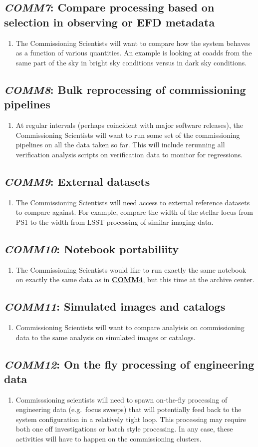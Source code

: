 \documentclass[DM,toc,lsstdraft]{lsstdoc}
\newcommand{\usecase}[3]{%
\subsection{\emph{#1}: #2}
\label{use:#1}
\begin{enumerate}[label=\alph*.]
#3
\end{enumerate}
}
\newcommand{\useref}[1]{\hyperref[use:#1]{\textcolor{lsstblue}{\textbf{#1}}}}
\begin{document}
\usecase{COMM7}{Compare processing based on selection in observing or EFD metadata}{%

\item
The Commissioning Scientists will want to compare how the system behaves as a function of various quantities.
An example is looking at coadds from the same part of the sky in bright sky conditions versus in dark sky conditions.

}

\usecase{COMM8}{Bulk reprocessing of commissioning pipelines}{%

\item
At regular intervals (perhaps coincident with major software releases), the Commissioning Scientists will want to run some set of the commissioning pipelines on all the data taken so far.
This will include rerunning all verification analysis scripts on verification data to monitor for regressions.

}

\usecase{COMM9}{External datasets}{%

\item
The Commissioning Scientists will need access to external reference datasets to compare against.
For example, compare the width of the stellar locus from PS1 to the width from LSST processing of similar imaging data.

}

\usecase{COMM10}{Notebook portabiliity}{%

\item
The Commissioning Scientists would like to run exactly the same notebook on exactly the same data as in \useref{COMM4}, but this time at the archive center.

}

\usecase{COMM11}{Simulated images and catalogs}{%

\item
Commissioning Scientists will want to compare analyisis on commissioning data to the same analysis on simulated images or catalogs.

}

\usecase{COMM12}{On the fly processing of engineering data}{%

\item
Commisssioning scientists will need to spawn on-the-fly processing of engineering data (e.g.\ focus sweeps) that will potentially feed back to the system configuration in a relatively tight loop.
This processing may require both one off investigations or batch style processing.
In any case, these activities will have to happen on the commissioning clusters.

}
\end{document}
